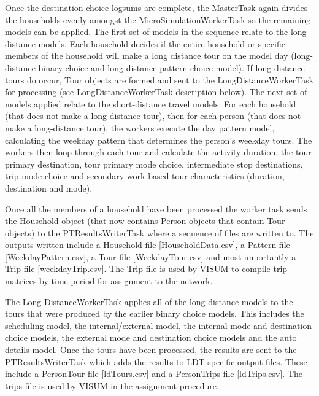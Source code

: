 Once the destination choice logsums are complete, the MasterTask again divides the households evenly amongst the MicroSimulationWorkerTask so the remaining models can be applied. The first set of models in the sequence relate to the long-distance models. Each household decides if the entire household or specific members of the household will make a long distance tour on the model day (long-distance binary choice and long distance pattern choice model). If long-distance tours do occur, Tour objects are formed and sent to the LongDistanceWorkerTask for processing (see LongDistanceWorkerTask description below). The next set of models applied relate to the short-distance travel models. For each household (that does not make a long-distance tour), then for each person (that does not make a long-distance tour), the workers execute the day pattern model, calculating the weekday pattern that determines the person's weekday tours. The workers then loop through each tour and calculate the activity duration, the tour primary destination, tour primary mode choice, intermediate stop destinations, trip mode choice and secondary work-based tour characteristics (duration, destination and mode). 

Once all the members of a household have been processed the worker task sends the Household object (that now contains Person objects that contain Tour objects) to the PTResultsWriterTask where a sequence of files are written to. The outputs written include a Household file [HouseholdData.csv], a Pattern file [WeekdayPattern.csv], a Tour file [WeekdayTour.csv] and most importantly a Trip file [weekdayTrip.csv]. The Trip file is used by VISUM to compile trip matrices by time period for assignment to the network. 

The Long-DistanceWorkerTask applies all of the long-distance models to the tours that were produced by the earlier binary choice models. This includes the scheduling model, the internal/external model, the internal mode and destination choice models, the external mode and destination choice models and the auto details model. Once the tours have been processed, the results are sent to the PTResultsWriterTask which adds the results to LDT specific output files. These include a PersonTour file [ldTours.csv] and a PersonTrips file [ldTrips.csv]. The trips file is used by VISUM in the assignment procedure.

